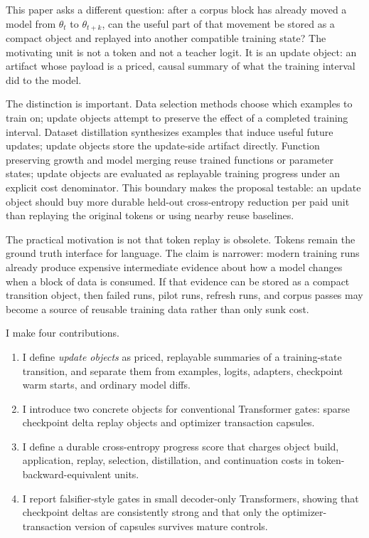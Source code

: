 \documentclass{article}
\begin{document}
This paper asks a different question: after a corpus block has already moved a
model from $\theta_t$ to $\theta_{t+k}$, can the useful part of that movement be
stored as a compact object and replayed into another compatible training state?
The motivating unit is not a token and not a teacher logit. It is an update
object: an artifact whose payload is a priced, causal summary of what the
training interval did to the model.

The distinction is important. Data selection methods choose which examples to
train on; update objects attempt to preserve the effect of a completed training
interval. Dataset distillation synthesizes examples that induce useful future
updates; update objects store the update-side artifact directly. Function
preserving growth and model merging reuse trained functions or parameter
states; update objects are evaluated as replayable training progress under an
explicit cost denominator. This boundary makes the proposal testable: an update
object should buy more durable held-out cross-entropy reduction per paid unit
than replaying the original tokens or using nearby reuse baselines.

The practical motivation is not that token replay is obsolete. Tokens remain
the ground truth interface for language. The claim is narrower: modern training
runs already produce expensive intermediate evidence about how a model changes
when a block of data is consumed. If that evidence can be stored as a compact
transition object, then failed runs, pilot runs, refresh runs, and corpus
passes may become a source of reusable training data rather than only sunk
cost.

I make four contributions.
\begin{enumerate}
  \item I define \emph{update objects} as priced, replayable summaries of a
  training-state transition, and separate them from examples, logits, adapters,
  checkpoint warm starts, and ordinary model diffs.
  \item I introduce two concrete objects for conventional Transformer gates:
  sparse checkpoint delta replay objects and optimizer transaction capsules.
  \item I define a durable cross-entropy progress score that charges object
  build, application, replay, selection, distillation, and continuation costs in
  token-backward-equivalent units.
  \item I report falsifier-style gates in small decoder-only Transformers,
  showing that checkpoint deltas are consistently strong and that only the
  optimizer-transaction version of capsules survives mature controls.
\end{enumerate}
\end{document}
